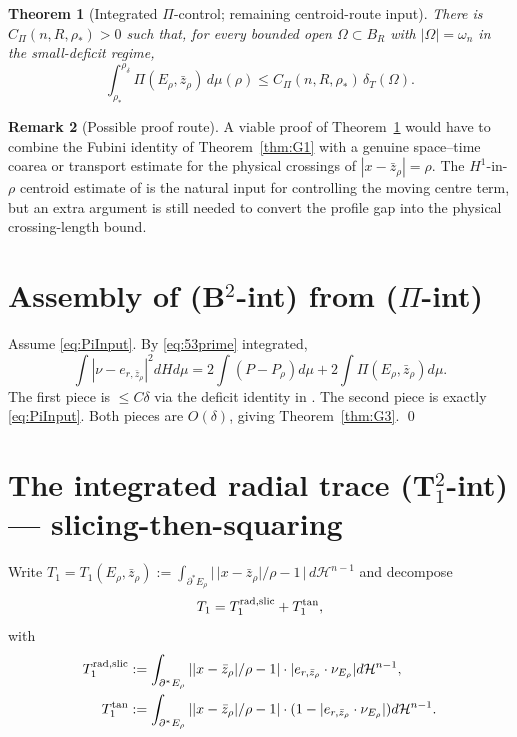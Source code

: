 \documentclass[11pt]{article}
\newtheorem{theorem}{Theorem}[section]
\theoremstyle{definition}
\newtheorem{remark}[theorem]{Remark}
\newcommand{\Om}{\Omega}
\newcommand{\rstar}{\rho_{*}}
\newcommand{\zbar}{\bar z_{\rho}}
\newcommand{\er}{e_{r,\zbar}}
\newcommand{\PiE}{\Pi(E_{\rho},\zbar)}
\begin{document}
\begin{theorem}[Integrated \(\Pi\)-control; remaining centroid-route input]
\label{thm:PiInput}
There is \(C_\Pi(n,R,\rstar)>0\) such that, for every bounded open
\(\Om\subset B_R\) with \(|\Om|=\omega_n\) in the small-deficit regime,
\begin{equation}\label{eq:PiInput}
   \int_{\rstar}^{\rho_\delta}\PiE\,d\mu(\rho)
   \le C_\Pi(n,R,\rstar)\,\delta_T(\Om).
   \tag{\(\Pi\)-int}
\end{equation}
\end{theorem}

\begin{remark}[Possible proof route]
A viable proof of Theorem~\ref{thm:PiInput} would have to combine the
Fubini identity of Theorem~\ref{thm:G1} with a genuine space--time
coarea or transport estimate for the physical crossings of
\(|x-\bar z_\rho|=\rho\). The \(H^1\)-in-\(\rho\) centroid estimate of
\cite{CentroidBound} is the natural input for controlling the moving
centre term, but an extra argument is still needed to convert the
profile gap into the physical crossing-length bound.
\end{remark}

\section{Assembly of (B$^2$-int) from \textup{($\Pi$-int)}}\label{sec:G3}

Assume \eqref{eq:PiInput}. By \eqref{eq:53prime} integrated,
\[
   \int|\nu-\er|^2 dH d\mu = 2\int(P-P_\rho)d\mu+2\int\PiE d\mu.
\]
The first piece is $\le C\delta$ via the deficit identity in
\cite{LevelSetIdentity}.
The second piece is exactly \eqref{eq:PiInput}. Both pieces are
\(O(\delta)\), giving Theorem~\ref{thm:G3}. \hfill\qed

\section{The integrated radial trace (T$_1^2$-int) --- slicing-then-squaring}\label{sec:T1}

Write $T_1=T_1(E_\rho,\zbar):=\int_{\partial^*E_\rho}\lvert\,\lvert x-\zbar\rvert/\rho-1\,\rvert\,d\mathcal H^{n-1}$
and decompose
\[
   T_1 = T_1^{\rm rad,slic}+T_1^{\rm tan},
\]
with
\begin{align*}
   T_1^{\rm rad,slic}&:=\int_{\partial^*E_\rho}||x-\zbar|/\rho-1|\cdot|\er\cdot\nu_{E_\rho}|d\mathcal H^{n-1},\\
   T_1^{\rm tan}&:=\int_{\partial^*E_\rho}||x-\zbar|/\rho-1|\cdot(1-|\er\cdot\nu_{E_\rho}|)d\mathcal H^{n-1}.
\end{align*}
\end{document}
